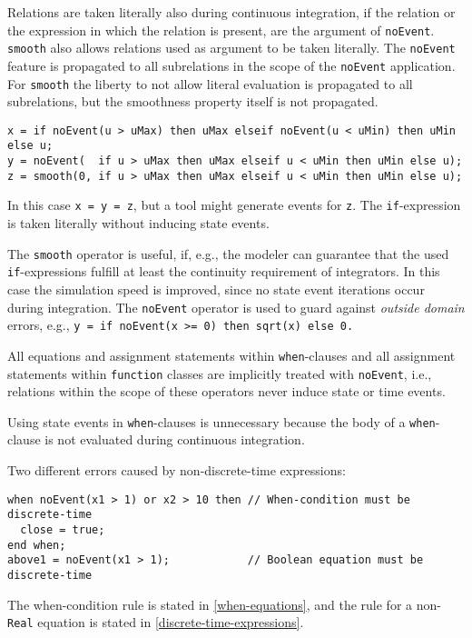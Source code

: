 Relations are taken literally also during continuous integration, if the relation or the expression in which the relation is present, are the argument of \lstinline!noEvent!.
\lstinline!smooth! also allows relations used as argument to be taken literally.
The \lstinline!noEvent! feature is propagated to all subrelations in the scope of the \lstinline!noEvent! application.
For \lstinline!smooth! the liberty to not allow literal evaluation is propagated to all subrelations, but the smoothness property itself is not propagated.

\begin{example}
\begin{lstlisting}[language=modelica]
x = if noEvent(u > uMax) then uMax elseif noEvent(u < uMin) then uMin else u;
y = noEvent(  if u > uMax then uMax elseif u < uMin then uMin else u);
z = smooth(0, if u > uMax then uMax elseif u < uMin then uMin else u);
\end{lstlisting}

In this case \lstinline!x = y = z!, but a tool might generate events for \lstinline!z!.
The \lstinline!if!-expression is taken literally without inducing state events.

The \lstinline!smooth! operator is useful, if, e.g., the modeler can guarantee that the used \lstinline!if!-expressions fulfill at least the continuity requirement of integrators.
In this case the simulation speed is improved, since no state event iterations occur during integration.
The \lstinline!noEvent! operator is used to guard against \emph{outside domain} errors, e.g., \lstinline!y = if noEvent(x >= 0) then sqrt(x) else 0.!
\end{example}

All equations and assignment statements within \lstinline!when!-clauses and all assignment statements within \lstinline!function! classes are implicitly treated with \lstinline!noEvent!, i.e., relations within the scope of these operators never induce state or time events.

\begin{nonnormative}
Using state events in \lstinline!when!-clauses is unnecessary because the body of a \lstinline!when!-clause is not evaluated during continuous integration.
\end{nonnormative}

\begin{example}
Two different errors caused by non-discrete-time expressions:
\begin{lstlisting}[language=modelica]
when noEvent(x1 > 1) or x2 > 10 then // When-condition must be discrete-time
  close = true;
end when;
above1 = noEvent(x1 > 1);            // Boolean equation must be discrete-time
\end{lstlisting}
The when-condition rule is stated in \cref{when-equations}, and the rule for a non-\lstinline!Real! equation is stated in \cref{discrete-time-expressions}.
\end{example}


